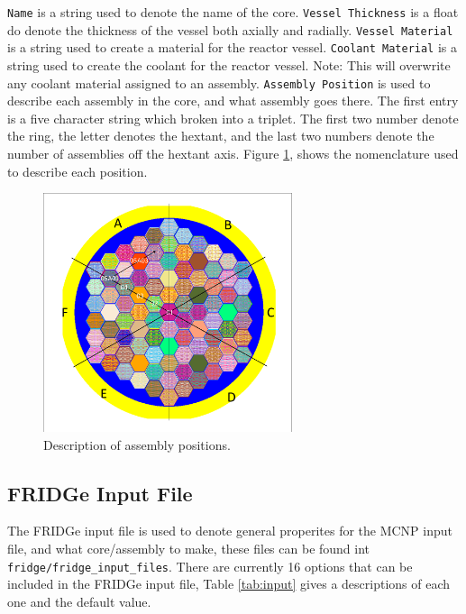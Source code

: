 \documentclass{article}
\begin{document}
\verb|Name| is a string used to denote the name of the core. \verb|Vessel Thickness| is a float do denote the thickness of the vessel both axially and radially. \verb|Vessel Material| is a string used to create a material for the reactor vessel. \verb|Coolant Material| is a string used to create the coolant for the reactor vessel. Note: This will overwrite any coolant material assigned to an assembly. \verb|Assembly Position| is used to describe each assembly in the core, and what assembly goes there. The first entry is a five character string which broken into a triplet. The first two number denote the ring, the letter denotes the hextant, and the last two numbers denote the number of assemblies off the hextant axis. Figure \ref{fig: Core}, shows the nomenclature used to describe each position.

\begin{figure}
    \centering
    \includegraphics[width=0.65\textwidth]{FullCore.pdf}
    \caption{Description of assembly positions.}
    \label{fig: Core}
\end{figure}

\subsection{FRIDGe Input File}

The FRIDGe input file is used to denote general properites for the MCNP input file, and what core/assembly to make, these files can be found int \verb|fridge/fridge_input_files|. There are currently 16 options that can be included in the FRIDGe input file, Table \ref{tab:input} gives a descriptions of each one and the default value.
\end{document}
